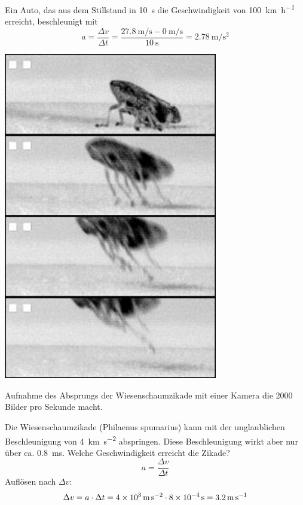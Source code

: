 \begin{example}
Ein Auto, das aus dem Stillstand in \SI{10}{\second} die Geschwindigkeit von \SI{100}{\kilo \metre \per \hour} erreicht, beschleunigt mit
\[ a= \frac{\Delta v}{\Delta t} = \frac{\SI{27.8}{\metre \per \second} - \SI{0}{\metre \per \second}}{\SI{10}{\second}} = \SI{2.78}{\metre \per \second \squared} \]
\end{example}
\begin{marginfigure}
    \includegraphics[width=0.7\textwidth]{Bilder/zikade.jpg}
    \caption{Aufnahme des Absprungs der Wiesenschaumzikade mit einer Kamera die 2000 Bilder pro Sekunde macht.}
\end{marginfigure}
\begin{example}
Die Wiesenschaumzikade (Philaenus spumarius) kann mit der unglaublichen Beschleunigung von \SI{4}{\kilo \metre \per \second \squared} abspringen. Diese Beschleunigung wirkt aber nur über ca. \SI{0.8}{\milli \second}. Welche Geschwindigkeit erreicht die Zikade?
\[ a= \frac{\Delta v}{\Delta t} \]
Auflösen nach $\Delta v$:
\[ \Delta v = a \cdot \Delta t =  \SI{4E3}{ \metre \per \second \squared} \cdot \SI{8E-4}{\second} = \SI{3.2}{\metre \per \second}\]

\end{example} \newpage
